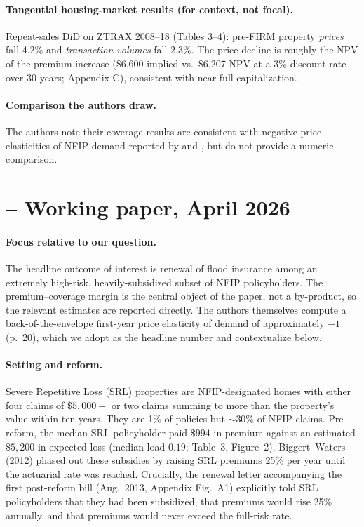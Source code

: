 \documentclass[11pt]{article}
\begin{document}
\paragraph{Tangential housing-market results (for context, not focal).}
Repeat-sales DiD on ZTRAX 2008--18 (Tables 3--4): pre-FIRM property \emph{prices}
fall 4.2\% and \emph{transaction volumes} fall 2.3\%. The price decline is roughly
the NPV of the premium increase (\$6{,}600 implied vs.\ \$6{,}207 NPV at a 3\% discount
rate over 30 years; Appendix C), consistent with near-full capitalization.

\paragraph{Comparison the authors draw.}
The authors note their coverage results are consistent with negative price elasticities
of NFIP demand reported by \citet{bradt2021} and \citet{wagner2022}, but do not provide
a numeric comparison.

\section{\citet{collier2026} -- Working paper, April 2026}

\paragraph{Focus relative to our question.}
The headline outcome of interest is renewal of flood insurance among an
extremely high-risk, heavily-subsidized subset of NFIP policyholders. The
premium--coverage margin is the central object of the paper, not a
by-product, so the relevant estimates are reported directly. The authors
themselves compute a back-of-the-envelope first-year price elasticity of
demand of approximately $-1$ (p.~20), which we adopt as the headline number
and contextualize below.

\paragraph{Setting and reform.}
Severe Repetitive Loss (SRL) properties are NFIP-designated homes with
either four claims of $\$5{,}000{+}$ or two claims summing to more than the
property's value within ten years. They are 1\% of policies but $\sim$30\%
of NFIP claims. Pre-reform, the median SRL policyholder paid $\$994$ in
premium against an estimated $\$5{,}200$ in expected loss (median load
$0.19$; Table~3, Figure~2). Biggert--Waters (2012) phased out these
subsidies by raising SRL premiums 25\% per year until the actuarial rate
was reached. Crucially, the renewal letter accompanying the first
post-reform bill (Aug.\ 2013, Appendix Fig.~A1) explicitly told SRL
policyholders that they had been subsidized, that premiums would rise 25\%
annually, and that premiums would never exceed the full-risk rate.
\end{document}
